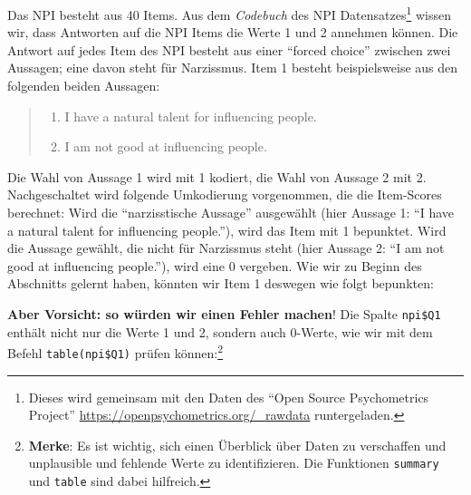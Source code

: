 \documentclass[12pt,]{tufte-book}
\newenvironment{Shaded}{\begin{snugshade}}{\end{snugshade}}
\newcommand{\KeywordTok}[1]{\textcolor[rgb]{0.13,0.29,0.53}{\textbf{#1}}}
\newcommand{\DecValTok}[1]{\textcolor[rgb]{0.00,0.00,0.81}{#1}}
\newcommand{\StringTok}[1]{\textcolor[rgb]{0.31,0.60,0.02}{#1}}
\newcommand{\OperatorTok}[1]{\textcolor[rgb]{0.81,0.36,0.00}{\textbf{#1}}}
\newcommand{\NormalTok}[1]{#1}
\providecommand{\tightlist}{%
  \setlength{\itemsep}{0pt}\setlength{\parskip}{0pt}}
\theoremstyle{definition}
\theoremstyle{definition}
\theoremstyle{definition}
\theoremstyle{remark}
\begin{document}
Das NPI besteht aus 40 Items. Aus dem \emph{Codebuch} des NPI
Datensatzes\footnote{Dieses wird gemeinsam mit den Daten des ``Open
  Source Psychometrics Project''
  \url{https://openpsychometrics.org/_rawdata} runtergeladen.} wissen
wir, dass Antworten auf die NPI Items die Werte 1 und 2 annehmen können.
Die Antwort auf jedes Item des NPI besteht aus einer ``forced choice''
zwischen zwei Aussagen; eine davon steht für Narzissmus. Item 1 besteht
beispielsweise aus den folgenden beiden Aussagen:

\begin{quote}
\begin{enumerate}
\def\labelenumi{\arabic{enumi}.}
\tightlist
\item
  I have a natural talent for influencing people.
\item
  I am not good at influencing people.
\end{enumerate}
\end{quote}

Die Wahl von Aussage 1 wird mit 1 kodiert, die Wahl von Aussage 2 mit 2.
Nachgeschaltet wird folgende Umkodierung vorgenommen, die die
Item-Scores berechnet: Wird die ``narzisstische Aussage'' ausgewählt
(hier Aussage 1: ``I have a natural talent for influencing people.''),
wird das Item mit 1 bepunktet. Wird die Aussage gewählt, die nicht für
Narzissmus steht (hier Aussage 2: ``I am not good at influencing
people.''), wird eine 0 vergeben. Wie wir zu Beginn des Abschnitts
gelernt haben, könnten wir Item 1 deswegen wie folgt bepunkten:

\begin{Shaded}
\end{Shaded}

\textbf{Aber Vorsicht: so würden wir einen Fehler machen}! Die Spalte
\texttt{npi\$Q1} enthält nicht nur die Werte 1 und 2, sondern auch
0-Werte, wie wir mit dem Befehl \texttt{table(npi\$Q1)} prüfen
können:\footnote{\textbf{Merke}: Es ist wichtig, sich einen Überblick
  über Daten zu verschaffen und unplausible und fehlende Werte zu
  identifizieren. Die Funktionen \texttt{summary} und \texttt{table}
  sind dabei hilfreich.}

\begin{Shaded}
\end{Shaded}
\end{document}

